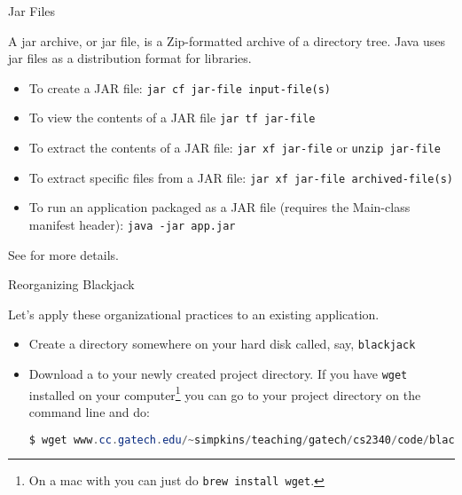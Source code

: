\documentclass{beamer}
\begin{document}
\begin{frame}[fragile]{Jar Files}

A jar archive, or jar file, is a Zip-formatted archive of a directory tree.
Java uses jar files as a distribution format for libraries.

\begin{itemize}
\item To create a JAR file: {\tt jar cf jar-file input-file(s)}
\item To view the contents of a JAR file {\tt jar tf jar-file}
\item To extract the contents of a JAR file: {\tt jar xf jar-file} or {\tt unzip jar-file}
\item To extract specific files from a JAR file: {\tt jar xf jar-file archived-file(s)}
\item To run an application packaged as a JAR file (requires the Main-class manifest header): {\tt java -jar app.jar}
\end{itemize}

See
 for more details.

\end{frame}

\begin{frame}[fragile]{Reorganizing Blackjack}

Let's apply these organizational practices to an existing application.
\begin{itemize}
\item Create a directory somewhere on your hard disk called, say, {\tt blackjack}
\item Download a  to your newly created project directory.  If you have {\tt wget} installed on your computer\footnote{On a mac with  you can just do {\tt brew install wget}.} you can go to your project directory on the command line and do:
\begin{lstlisting}[language=Java]
$ wget www.cc.gatech.edu/~simpkins/teaching/gatech/cs2340/code/blackjack/blackjack.zip
\end{lstlisting}
\end{itemize}

\end{frame}
\end{document}
